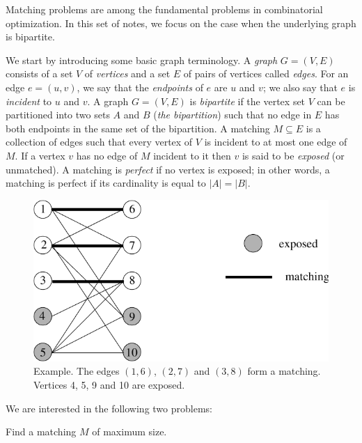 \documentclass[12pt]{article}
\begin{document}

\bigskip

Matching problems are among the fundamental problems in combinatorial
optimization. In this set of notes, we focus on the case when the
underlying graph is bipartite.  

We start by introducing some basic graph terminology. A {\it graph}
$G=(V,E)$ consists of a set $V$ of {\it vertices} and a set $E$ of
pairs of vertices called {\it edges}. For an edge $e=(u,v)$, we say
that the {\it endpoints} of $e$ are $u$ and $v$; we also say that $e$
is {\it incident} to $u$ and $v$.  A graph $G=(V,E)$ is {\it
bipartite} if the vertex set $V$ can be partitioned into two sets $A$
and $B$ ({\it the bipartition}) such that no edge in $E$ has both
endpoints in the same set of the bipartition. A matching $M\subseteq
E$ is a collection of edges such that every vertex of $V$ is incident
to at most one edge of $M$. If a vertex $v$ has no edge of $M$
incident to it then $v$ is said to be {\it exposed} (or unmatched). A
matching is {\it perfect} if no vertex is exposed; in other words, a
matching is perfect if its cardinality is equal to $|A|=|B|$.

\begin{figure}[htbp]
\begin{center}
\includegraphics{../figures/bipartite}
\end{center}
\caption{Example. The edges $(1,6)$, $(2,7)$ and $(3,8)$ form a
matching. Vertices 4, 5, 9 and 10 are exposed. }
\label{bipartite}
\end{figure}

We are interested in the following two problems:

\medskip
{} Find a matching
$M$ of maximum size.
\end{document}
